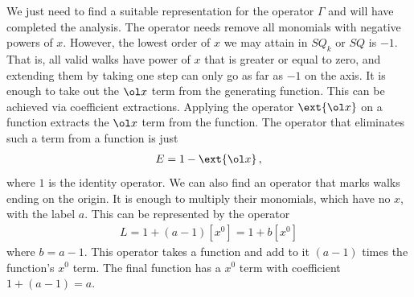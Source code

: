 We just need to find a suitable representation for the operator $\Gamma$ and will have completed the analysis. The operator needs remove all monomials with negative powers of $x$. However, the lowest order of $x$ we may attain in $SQ_k$ or $SQ$ is $-1$. That is, all valid walks have power of $x$ that is greater or equal to zero, and extending them by taking one step can only go as far as $-1$ on the axis. It is enough to take out the $\ol x$ term from the generating function. This can be achieved via coefficient extractions. Applying the operator $\ext{\ol x}$ on a function extracts the $\ol x$ term from the function. The operator that eliminates such a term from a function is just
\begin{align}
	E = 1 - \ext{\ol x}\,,
\end{align}
where $1$ is the identity operator. We can also find an operator that marks walks ending on the origin. It is enough to multiply their monomials, which have no $x$, with the label $a$. This can be represented by the operator
\begin{align}
	L = 1 + (a-1) [x^0] = 1 + b[x^0]
\end{align}
where $b = a-1$. This operator takes a function and add to it $(a-1)$ times the function's $x^0$ term. The final function has a $x^0$ term with coefficient $1 + (a-1) = a$. 

